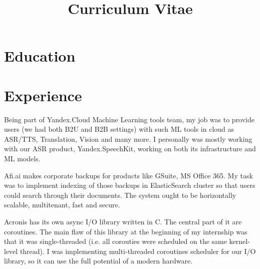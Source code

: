 \documentclass[10pt,a4paper,sans]{moderncv} %
\title{Curriculum Vitae}
\begin{document}
\makecvtitle %


\section{Education}


\section{Experience}

{Being part of Yandex.Cloud Machine Learning tools team, my job was to provide users (we had both B2U and B2B settings) with such ML tools in cloud as ASR/TTS, Translation, Vision and many more. I personally was mostly working with our ASR product, Yandex.SpeechKit, working on both its infrastructure and ML models.}

{Afi.ai makes corporate backups for products like GSuite, MS Office 365. My task was to implement indexing of those backups in ElasticSearch cluster so that users could search through their documents. The system ought to be horizontally scalable, multitenant, fast and secure.}

{Acronis has its own async I/O library written in C. The central part of it are coroutines. The
main flaw of this library at the beginning of my internship was that it was single-threaded (i.e. all corouties were scheduled on the same kernel-level thread).
I was implementing multi-threaded coroutines scheduler for our I/O library, so it can use the full potential of a modern hardware.}
\end{document}
